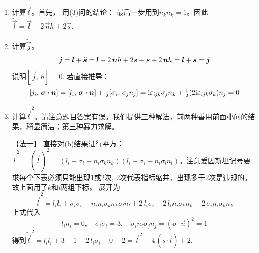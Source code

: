 \begin{enumerate}[label=\textbf{6.\arabic*}, listparindent=\parindent, leftmargin=-0.5mm]
\begin{enumerate}
    \item 计算$\tilde{\vec{l}}$。首先，
    用(3)问的结论：
    最后一步用到$n_kn_k=1$。因此$\tilde{\vec{l}}=\vec{l}-2\,\vec{n}h+2\vec{s}$.
    \item 计算$\tilde{\vec{j}}$。
    \[\tilde{\boldsymbol{j}}=\tilde{\boldsymbol{l}}+\tilde{\boldsymbol{s}}= \boldsymbol{l}-2\,\boldsymbol{n}h+2\boldsymbol{s}-\boldsymbol{s}+2\,\boldsymbol{n} h =\boldsymbol{l}+\boldsymbol{s}= \boldsymbol{j}\]
    说明$[\vec{j},\,h]=0$.
    若直接推导：
    \[[j_i,\,\boldsymbol{\sigma\cdot n}]=[l_i,\,\boldsymbol{\sigma\cdot n}]+\tfrac{1}{2}[\sigma_i,\,\sigma_jn_j]=\mathrm{i}\varepsilon_{ijk}\sigma_jn_k+\tfrac{1}{2}(2\mathrm{i}\varepsilon_{ijk}\sigma_k)n_j = 0\]
    
    \item 计算$\tilde{\vec{l}}^2$。{\color{red}请注意题目答案有误。}我们提供三种解法，前两种善用前面小问的结果，稍显简洁；第三种暴力求解。
    
    【法一】
    直接对(b)结果进行平方：$\tilde{\vec{l}}^2=(\tilde{\vec{l}})^2=(l_i+\sigma_i-n_i\sigma_kn_k)(l_i+\sigma_i-n_i\sigma_ln_l)$。注意爱因斯坦记号要求每个下表必须只能出现1或2次, 2次代表指标缩并，出现多于2次是违规的。故上面用了$k$和$l$两组下标。
    展开为
    \[\tilde{\vec{l}}^2 = l_il_i+\sigma_i\sigma_i+ n_in_i\sigma_kn_k\sigma_ln_l+
    2\,l_i\sigma_i-2\,l_in_i\sigma_kn_k - 2\,\sigma_in_i\sigma_kn_k \]
    上式代入
    \[l_in_i=0,\quad \sigma_i\sigma_i = 3,\quad\sigma_in_i\sigma_jn_j=(\vec{\sigma\cdot n})^2=1\]
    得到$\tilde{\vec{l}}^2=l_il_i+3+1+2\,l_i\sigma_i-0-2 = \vec{l}^2+4\,(\vec{s\cdot l})+2$.
    

\end{enumerate}
\end{enumerate}
